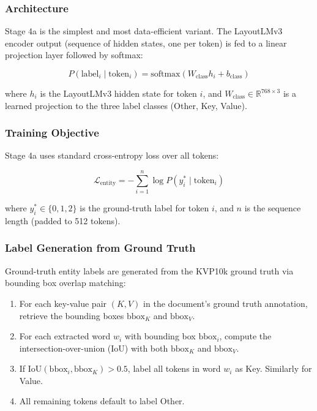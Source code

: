 \subsubsection{Architecture}

Stage 4a is the simplest and most data-efficient variant. The LayoutLMv3 encoder output (sequence of hidden states, one per token) is fed to a linear projection layer followed by softmax:

\[
P(\text{label}_i \mid \text{token}_i) = \text{softmax}(W_{\text{class}} h_i + b_{\text{class}})
\]

where $h_i$ is the LayoutLMv3 hidden state for token $i$, and $W_{\text{class}} \in \mathbb{R}^{768 \times 3}$ is a learned projection to the three label classes (Other, Key, Value).

\subsubsection{Training Objective}

Stage 4a uses standard cross-entropy loss over all tokens:

\[
\mathcal{L}_{\text{entity}} = -\sum_{i=1}^{n} \log P(y_i^* \mid \text{token}_i)
\]

where $y_i^* \in \{0, 1, 2\}$ is the ground-truth label for token $i$, and $n$ is the sequence length (padded to 512 tokens).

\subsubsection{Label Generation from Ground Truth}

Ground-truth entity labels are generated from the KVP10k ground truth via bounding box overlap matching:

\begin{enumerate}
    \item For each key-value pair $(K, V)$ in the document's ground truth annotation, retrieve the bounding boxes $\text{bbox}_K$ and $\text{bbox}_V$.
    
    \item For each extracted word $w_i$ with bounding box $\text{bbox}_i$, compute the intersection-over-union (IoU) with both $\text{bbox}_K$ and $\text{bbox}_V$.
    
    \item If $\text{IoU}(\text{bbox}_i, \text{bbox}_K) > 0.5$, label all tokens in word $w_i$ as Key. Similarly for Value.
    
    \item All remaining tokens default to label Other.
\end{enumerate}

